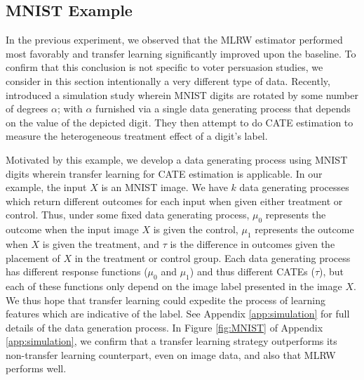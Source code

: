 


\subsection{MNIST Example} \label{section:MNIST}



In the previous experiment, we observed that the MLRW estimator performed most favorably and transfer learning significantly improved upon the baseline. To confirm that this conclusion is not specific to voter persuasion studies, we consider in this section intentionally a very different type of data.
Recently, \cite{nie2017learning} introduced a simulation study wherein MNIST digits are rotated by some number of degrees $\alpha$; with $\alpha$ furnished via a single data generating process that depends on the value of the depicted digit. They then attempt to do CATE estimation to measure the heterogeneous treatment effect of a digit's label. 

Motivated by this example, we develop a data generating process using MNIST digits wherein transfer learning for CATE estimation is applicable. In our example, the input $X$ is an MNIST image. We have $k$ data generating processes which return different outcomes for each input when given either treatment or control. Thus, under some fixed data generating process, $\mu_0$ represents the outcome when the input image $X$ is given the control, $\mu_1$ represents the outcome when $X$ is given the treatment, and $\tau$ is the difference in outcomes given the placement of $X$ in the treatment or control group. Each data generating process has different response functions ($\mu_0$ and $\mu_1$) and thus different CATEs ($\tau$), but each of these functions only depend on the image label presented in the image $X$. We thus hope that transfer learning could expedite the process of learning features which are indicative of the label. See Appendix \ref{app:simulation} for full details of the data generation process. 
In Figure \ref{fig:MNIST} of Appendix \ref{app:simulation}, we confirm that a transfer learning strategy outperforms its non-transfer learning counterpart, even on image data, and also that MLRW performs well.



